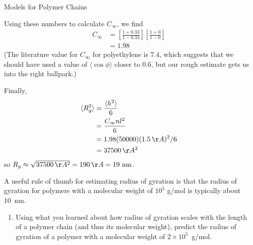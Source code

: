 \begin{activity}{Models for Polymer Chains}
\begin{exercises}
\begin{solution}
{			Using these numbers to calculate $C_\infty$, we find
			\begin{align*}
				C_\infty &= \left[\frac{1+0.33}{1-0.33}\right]\left[\frac{1+0}{1-0}\right]\\
				&= 1.98
			\end{align*}
			(The literature value for $C_\infty$ for polyethylene is 7.4, which suggests that we should have used a value of $\langle\cos\phi\rangle$ closer to 0.6, but our rough estimate gets us into the right ballpark.)
			
			Finally,
			\begin{align*}
				\langle R_g^2\rangle &= \frac{\langle h^2\rangle}{6}\\
				&= \frac{C_\infty n l^2}{6} \\
				&= 1.98(50000)(1.5\,\AA)^2/6\\
				&= 37500\,\AA^2
			\end{align*}
			so $R_g \approx \sqrt{37500\,\AA^2} = 190\,\AA = 19\text{ nm}$.
		}\end{solution}

	\exercise A useful rule of thumb for estimating radius of gyration is that the radius of gyration for polymers with a molecular weight of $10^5$ g/mol is typically about 10~nm.
	
		\begin{enumerate}
			\item Using what you learned about how radius of gyration scales with the length of a polymer chain (and thus its molecular weight), predict the radius of gyration of a polymer with a molecular weight of $2\times10^5$~g/mol.
	
		\begin{solution}\end{solution}
			

\end{enumerate}
\end{exercises}
\end{activity}
